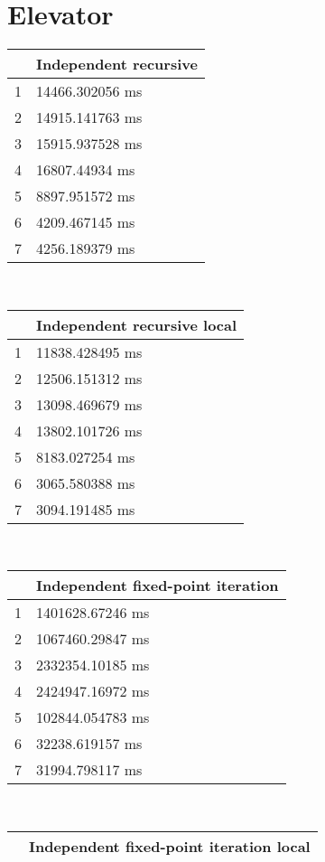 \section{Elevator}
\begin{multicols}{2}
	\begin{tabular}{|l|l|}
		\hline
		& Independent recursive \\ \hline
		1 & 14466.302056 ms \\ \hline
		2 & 14915.141763 ms \\ \hline
		3 & 15915.937528 ms \\ \hline
		4 & 16807.44934 ms \\ \hline
		5 & 8897.951572 ms \\ \hline
		6 & 4209.467145 ms \\ \hline
		7 & 4256.189379 ms \\ \hline
	\end{tabular}\\
	\begin{tabular}{|l|l|}
		\hline
		& Independent recursive local \\ \hline
		1 & 11838.428495 ms \\ \hline
		2 & 12506.151312 ms \\ \hline
		3 & 13098.469679 ms \\ \hline
		4 & 13802.101726 ms \\ \hline
		5 & 8183.027254 ms \\ \hline
		6 & 3065.580388 ms \\ \hline
		7 & 3094.191485 ms \\ \hline
	\end{tabular}\\
	\begin{tabular}{|l|l|}
		\hline
		& Independent fixed-point iteration \\ \hline
		1 & 1401628.67246 ms \\ \hline
		2 & 1067460.29847 ms \\ \hline
		3 & 2332354.10185 ms \\ \hline
		4 & 2424947.16972 ms \\ \hline
		5 & 102844.054783 ms \\ \hline
		6 & 32238.619157 ms \\ \hline
		7 & 31994.798117 ms \\ \hline
	\end{tabular}\\
	\begin{tabular}{|l|l|}
		\hline
		& Independent fixed-point iteration local \\ \hline

\end{tabular}
\end{multicols}
